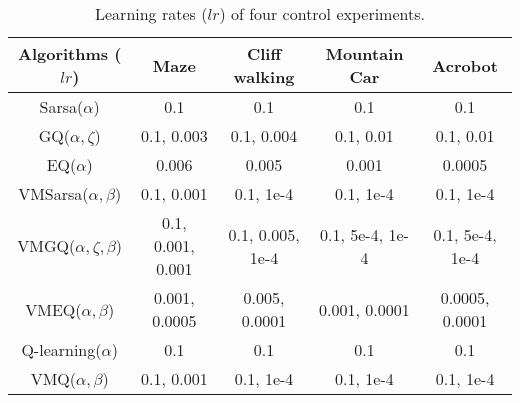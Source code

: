 \begin{table*}[htb]
    \centering
    \caption{Learning rates ($lr$) of four control experiments.}
    \label{lrofways}
    \begin{tabular}{ccccc}
      \toprule
      \multicolumn{1}{c}{Algorithms ($lr$)} & Maze & Cliff walking & Mountain Car & Acrobot \\
      \midrule
      Sarsa($\alpha$) & 0.1 & 0.1 & 0.1 & 0.1 \\
      GQ($\alpha,\zeta$) & 0.1, 0.003 & 0.1, 0.004 & 0.1, 0.01 & 0.1, 0.01 \\
      EQ($\alpha$) & 0.006 & 0.005 & 0.001 & 0.0005 \\
      VMSarsa($\alpha,\beta$) & 0.1, 0.001 & 0.1, 1e-4 & 0.1, 1e-4 & 0.1, 1e-4 \\
      VMGQ($\alpha,\zeta,\beta$) & 0.1, 0.001, 0.001 & 0.1, 0.005, 1e-4 & 0.1, 5e-4, 1e-4 & 0.1, 5e-4, 1e-4 \\
      VMEQ($\alpha,\beta$) & 0.001, 0.0005 & 0.005, 0.0001 & 0.001, 0.0001 & 0.0005, 0.0001 \\
      Q-learning($\alpha$) & 0.1 & 0.1 & 0.1 & 0.1 \\
      VMQ($\alpha,\beta$) & 0.1, 0.001 & 0.1, 1e-4 & 0.1, 1e-4 & 0.1, 1e-4 \\
      \bottomrule
    \end{tabular}
  \end{table*}